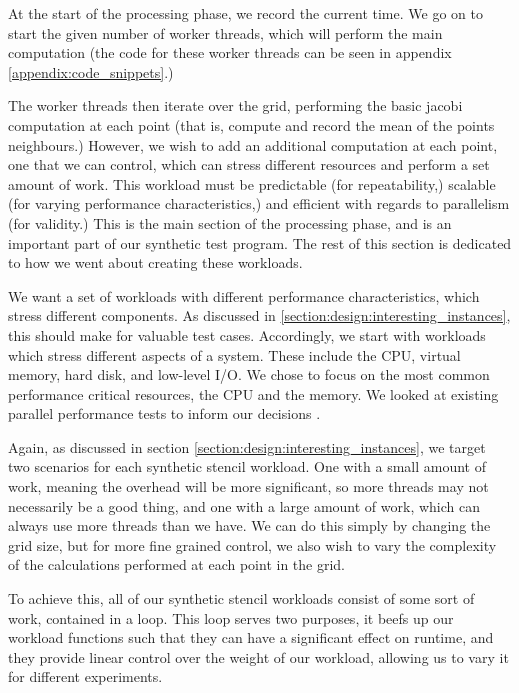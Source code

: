 At the start of the processing phase, we record the current time. We go on to start the given number of worker threads, which will perform the main computation (the code for these worker threads can be seen in appendix \ref{appendix:code_snippets}.)

The worker threads then iterate over the grid, performing the basic jacobi computation at each point (that is, compute and record the mean of the points neighbours.) However, we wish to add an additional computation at each point, one that we can control, which can stress different resources and perform a set amount of work. This workload must be predictable (for repeatability,) scalable (for varying performance characteristics,) and efficient with regards to parallelism (for validity.) This is the main section of the processing phase, and is an important part of our synthetic test program. The rest of this section is dedicated to how we went about creating these workloads.

We want a set of workloads with different performance characteristics, which stress different components. As discussed in \ref{section:design:interesting_instances}, this should make for valuable test cases. Accordingly, we start with workloads which stress different aspects of a system. These include the CPU, virtual memory, hard disk, and low-level I/O. We chose to focus on the most common performance critical resources, the CPU and the memory. We looked at existing parallel performance tests to inform our decisions \cite{hackenberg_ilsche_schone_molka_schmidt_nagel_2013, stress}.

Again, as discussed in section \ref{section:design:interesting_instances}, we target two scenarios for each synthetic stencil workload. One with a small amount of work, meaning the overhead will be more significant, so more threads may not necessarily be a good thing, and one with a large amount of work, which can always use more threads than we have. We can do this simply by changing the grid size, but for more fine grained control, we also wish to vary the complexity of the calculations performed at each point in the grid.

To achieve this, all of our synthetic stencil workloads consist of some sort of work, contained in a loop. This loop serves two purposes, it beefs up our workload functions such that they can have a significant effect on runtime, and they provide linear control over the weight of our workload, allowing us to vary it for different experiments.

